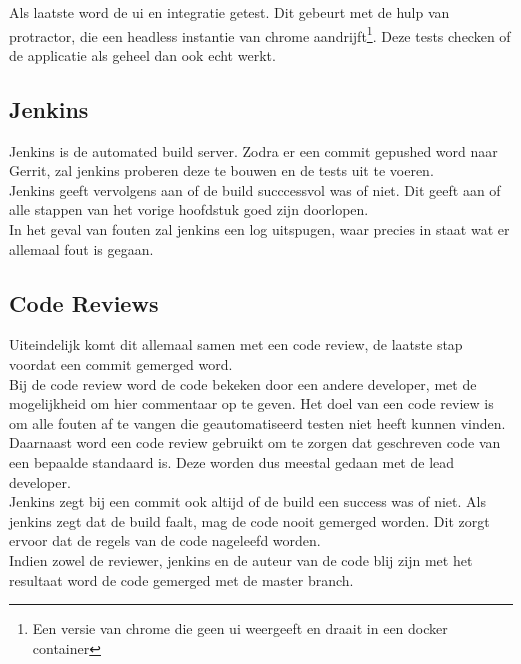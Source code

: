 Als laatste word de ui en integratie getest. Dit gebeurt met de hulp van protractor, die een headless instantie van chrome aandrijft\footnote{Een versie van chrome die geen ui weergeeft en draait in een docker container}. Deze tests checken of de applicatie als geheel dan ook echt werkt.

\subsection{Jenkins}

Jenkins is de automated build server. Zodra er een commit gepushed word naar Gerrit, zal jenkins proberen deze te bouwen en de tests uit te voeren. \\

Jenkins geeft vervolgens aan of de build succcessvol was of niet. Dit geeft aan of alle stappen van het vorige hoofdstuk goed zijn doorlopen. \\

In het geval van fouten zal jenkins een log uitspugen, waar precies in staat wat er allemaal fout is gegaan.

\subsection{Code Reviews}

Uiteindelijk komt dit allemaal samen met een code review, de laatste stap voordat een commit gemerged word. \\

Bij de code review word de code bekeken door een andere developer, met de mogelijkheid om hier commentaar op te geven. Het doel van een code review is om alle fouten af te vangen die geautomatiseerd testen niet heeft kunnen vinden. \\

Daarnaast word een code review gebruikt om te zorgen dat geschreven code van een bepaalde standaard is. Deze worden dus meestal gedaan met de lead developer. \\

Jenkins zegt bij een commit ook altijd of de build een success was of niet. Als jenkins zegt dat de build faalt, mag de code nooit gemerged worden. Dit zorgt ervoor dat de regels van de code nageleefd worden. \\

Indien zowel de reviewer, jenkins en de auteur van de code blij zijn met het resultaat word de code gemerged met de master branch.

